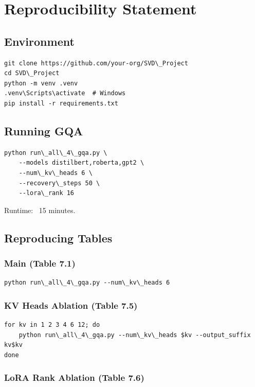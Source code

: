 
\section{Reproducibility Statement}

\subsection{Environment}

\begin{lstlisting}
git clone https://github.com/your-org/SVD\_Project
cd SVD\_Project
python -m venv .venv
.venv\Scripts\activate  # Windows
pip install -r requirements.txt
\end{lstlisting}

\subsection{Running GQA}

\begin{lstlisting}
python run\_all\_4\_gqa.py \
    --models distilbert,roberta,gpt2 \
    --num\_kv\_heads 6 \
    --recovery\_steps 50 \
    --lora\_rank 16
\end{lstlisting}

Runtime: ~15 minutes.

\subsection{Reproducing Tables}

\subsubsection{Main (Table 7.1)}

\begin{lstlisting}
python run\_all\_4\_gqa.py --num\_kv\_heads 6
\end{lstlisting}

\subsubsection{KV Heads Ablation (Table 7.5)}

\begin{lstlisting}
for kv in 1 2 3 4 6 12; do
    python run\_all\_4\_gqa.py --num\_kv\_heads $kv --output_suffix kv$kv
done
\end{lstlisting}

\subsubsection{LoRA Rank Ablation (Table 7.6)}

